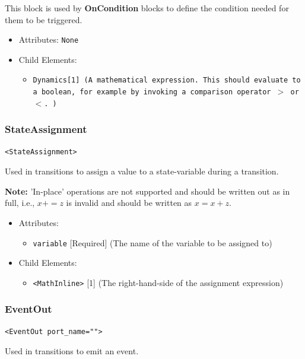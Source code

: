 \documentclass{article}
\newcommand{\note}[1]{%
\begin{center}
\colorbox{issuecolor}{\parbox{0.8\linewidth}{\textbf{Note:} #1}}
\end{center}%
}
\newcommand{\MathInline}{\tt{Dynamics}}
\newcommand{\OnCondition}{{\bf{OnCondition}}\xspace}
\begin{document}
This block is used by \OnCondition blocks to define the condition needed for
them to be triggered.

\begin{itemize}
\item Attributes: \texttt{None}

\item Child Elements:
%
\begin{itemize}
\item \MathInline {[}1{]} (A mathematical expression. This should evaluate to a
boolean, for example by invoking a comparison operator  $>$ or $<$. )
\end{itemize}
\end{itemize}

\subsubsection{StateAssignment}
%
\begin{lstlisting}
<StateAssignment>
\end{lstlisting}

Used in transitions to assign a value to a state-variable during a transition.

\note{'In-place' operations are not supported and should be written out as in
full,
i.e., $x+=z$ is invalid and should be written as $x=x+z$.}

\begin{itemize}
\item Attributes:
%
\begin{itemize}
\item \verb|variable| {[}Required{]} (The name of the variable to be assigned
to)
\end{itemize}

\item Child Elements:
%
\begin{itemize}
\item \verb|<MathInline>| {[}1{]} (The right-hand-side of the assignment
expression)
\end{itemize}
\end{itemize}

\subsubsection{EventOut}
%
\begin{lstlisting}
<EventOut port_name="">
\end{lstlisting}

Used in transitions to emit an event.
\end{document}
